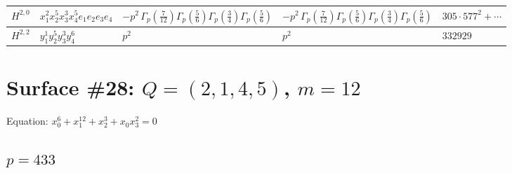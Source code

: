 \documentclass[11pt]{article}
\begin{document}
\begin{table}[ht]
{\begin{tabular}{@{}lllll@{}}
\midrule
$H^{2,0}$ & $x_{1}^{2} x_{2}^{5} x_{3}^{3} x_{4}^{5}  e_{1} e_{2} e_{3} e_{4}$ & $- p^{2} \, \Gamma_p \left( \frac{7}{12} \right) \Gamma_p \left( \frac{5}{6} \right) \Gamma_p \left( \frac{3}{4} \right) \Gamma_p \left( \frac{5}{6} \right)$ & $- p^{2} \, \Gamma_p \left( \frac{7}{12} \right) \Gamma_p \left( \frac{5}{6} \right) \Gamma_p \left( \frac{3}{4} \right) \Gamma_p \left( \frac{5}{6} \right)$ & $305{\cdot}577^{2}{+}\cdots$ \\
\midrule
$H^{2,2}$ & $y_{1}^{1} y_{2}^{5} y_{3}^{3} y_{4}^{6}$ & $p^{2} \,$ & $p^{2} \,$ & $332929$ \\
\bottomrule
\end{tabular}
}
\renewcommand{\arraystretch}{1.0}
\end{table}

\newpage

\section*{Surface \#28: $Q=(2, 1, 4, 5)$, $m=12$}

Equation: $x_0^{6} + x_1^{12} + x_2^{3} + x_0 x_3^{2} = 0$

\subsection*{$p = 433$}
\end{document}
